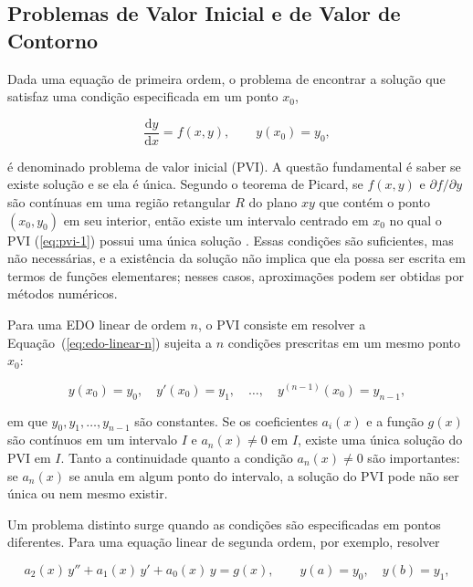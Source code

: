 \documentclass[arial,centeredequations,english,brazilian,oneside,section=TITLE]{ifes8}
\begin{document}
\subsection{Problemas de Valor Inicial e de Valor de Contorno}
\label{sub:pvi-pvc}
 
Dada uma equação de primeira ordem, o problema de encontrar a solução que satisfaz uma
condição especificada em um ponto $x_0$,

\begin{equation}
  \label{eq:pvi-1}
  \frac{\mathrm{d}y}{\mathrm{d}x} = f(x, y), \qquad y(x_0) = y_0,
\end{equation}

é denominado problema de valor inicial (PVI). A questão
fundamental é saber se existe solução e se ela é única. Segundo o teorema de Picard, se
$f(x, y)$ e $\partial f/\partial y$ são contínuas em uma região retangular $R$ do
plano $xy$ que contém o ponto $(x_0, y_0)$ em seu interior, então existe um intervalo
centrado em $x_0$ no qual o PVI (\ref{eq:pvi-1}) possui uma única solução
\cite{Zill2001v2}. Essas condições são suficientes, mas não necessárias, e a
existência da solução não implica que ela possa ser escrita em termos de funções
elementares; nesses casos, aproximações podem ser obtidas por métodos numéricos.
 
Para uma EDO linear de ordem $n$, o PVI consiste em resolver a
Equação~(\ref{eq:edo-linear-n}) sujeita a $n$ condições prescritas em um mesmo ponto
$x_0$:

\begin{equation}
  \label{eq:pvi-n}
  y(x_0) = y_0, \quad y'(x_0) = y_1, \quad \ldots, \quad y^{(n-1)}(x_0) = y_{n-1},
\end{equation}

em que $y_0, y_1, \ldots, y_{n-1}$ são constantes. Se os
coeficientes $a_i(x)$ e a função $g(x)$ são contínuos em um intervalo $I$ e
$a_n(x) \neq 0$ em $I$, existe uma única solução do PVI em $I$.
Tanto a continuidade quanto a condição $a_n(x) \neq 0$ são
importantes: se $a_n(x)$ se anula em algum ponto do intervalo, a solução do PVI pode
não ser única ou nem mesmo existir.
 
Um problema distinto surge quando as condições são especificadas em pontos diferentes.
Para uma equação linear de segunda ordem, por exemplo, resolver

\begin{equation}
  \label{eq:pvc}
  a_2(x)\,y'' + a_1(x)\,y' + a_0(x)\,y = g(x), \qquad y(a) = y_0, \quad y(b) = y_1,
\end{equation}
\end{document}
